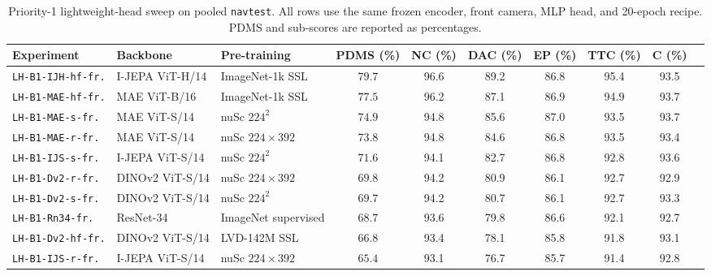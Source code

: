 \begin{table}[H]
\centering
\caption[Priority-1 lightweight-head sweep on \texttt{navtest}.]{Priority-1 lightweight-head sweep on pooled \texttt{navtest}. All rows use the same frozen encoder, front camera, MLP head, and 20-epoch recipe. PDMS and sub-scores are reported as percentages.}
\label{tab:exp-phase0-p1}
\footnotesize
\renewcommand{\arraystretch}{1.15}
\setlength{\tabcolsep}{4pt}
\begin{adjustbox}{max width=\textwidth}
\begin{tabular}{@{}>{\raggedright\arraybackslash}p{3.2cm} >{\raggedright\arraybackslash}p{2.4cm} >{\raggedright\arraybackslash}p{2.6cm} ccccccc@{}}
\toprule
\textbf{Experiment} & \textbf{Backbone} & \textbf{Pre-training} & \textbf{PDMS (\%)} & \textbf{NC (\%)} & \textbf{DAC (\%)} & \textbf{EP (\%)} & \textbf{TTC (\%)} & \textbf{C (\%)} \\
\midrule
\texttt{LH-B1-IJH-hf-fr.}  & I-JEPA ViT-H/14 & ImageNet-1k SSL         & $\mathbf{79.7}$ & 96.6 & 89.2 & 86.8 & 95.4 & 93.5 \\
\texttt{LH-B1-MAE-hf-fr.}  & MAE ViT-B/16    & ImageNet-1k SSL         & $77.5$ & 96.2 & 87.1 & 86.9 & 94.9 & 93.7 \\
\texttt{LH-B1-MAE-s-fr.}   & MAE ViT-S/14    & nuSc $224^2$            & $74.9$ & 94.8 & 85.6 & 87.0 & 93.5 & 93.7 \\
\texttt{LH-B1-MAE-r-fr.}   & MAE ViT-S/14    & nuSc $224{\times}392$   & $73.8$ & 94.8 & 84.6 & 86.8 & 93.5 & 93.4 \\
\texttt{LH-B1-IJS-s-fr.}   & I-JEPA ViT-S/14 & nuSc $224^2$            & $71.6$ & 94.1 & 82.7 & 86.8 & 92.8 & 93.6 \\
\texttt{LH-B1-Dv2-r-fr.}   & DINOv2 ViT-S/14 & nuSc $224{\times}392$   & $69.8$ & 94.2 & 80.9 & 86.1 & 92.7 & 92.9 \\
\texttt{LH-B1-Dv2-s-fr.}   & DINOv2 ViT-S/14 & nuSc $224^2$            & $69.7$ & 94.2 & 80.7 & 86.1 & 92.7 & 93.3 \\
\rowcolor{gray!15}
\texttt{LH-B1-Rn34-fr.}    & ResNet-34       & ImageNet supervised     & $68.7$ & 93.6 & 79.8 & 86.6 & 92.1 & 92.7 \\
\texttt{LH-B1-Dv2-hf-fr.}  & DINOv2 ViT-S/14 & LVD-142M SSL            & $66.8$ & 93.4 & 78.1 & 85.8 & 91.8 & 93.1 \\
\texttt{LH-B1-IJS-r-fr.}   & I-JEPA ViT-S/14 & nuSc $224{\times}392$   & $65.4$ & 93.1 & 76.7 & 85.7 & 91.4 & 92.8 \\
\bottomrule
\end{tabular}
\end{adjustbox}
\end{table}

